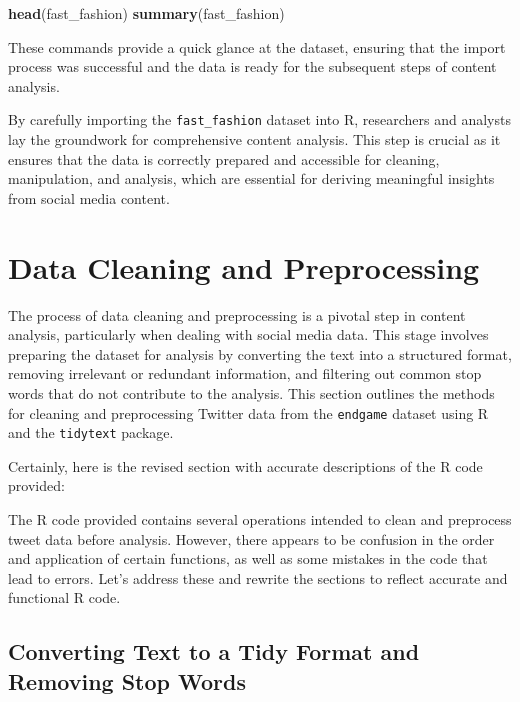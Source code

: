 \documentclass[
]{book}
\newenvironment{Shaded}{\begin{snugshade}}{\end{snugshade}}
\newcommand{\FunctionTok}[1]{\textcolor[rgb]{0.13,0.29,0.53}{\textbf{#1}}}
\newcommand{\NormalTok}[1]{#1}
\begin{document}
\begin{Shaded}
\begin{Highlighting}[]
\FunctionTok{head}\NormalTok{(fast\_fashion)}
\FunctionTok{summary}\NormalTok{(fast\_fashion)}
\end{Highlighting}
\end{Shaded}

These commands provide a quick glance at the dataset, ensuring that the import process was successful and the data is ready for the subsequent steps of content analysis.

By carefully importing the \texttt{fast\_fashion} dataset into R, researchers and analysts lay the groundwork for comprehensive content analysis. This step is crucial as it ensures that the data is correctly prepared and accessible for cleaning, manipulation, and analysis, which are essential for deriving meaningful insights from social media content.

\hypertarget{data-cleaning-and-preprocessing}{%
\section{Data Cleaning and Preprocessing}\label{data-cleaning-and-preprocessing}}

The process of data cleaning and preprocessing is a pivotal step in content analysis, particularly when dealing with social media data. This stage involves preparing the dataset for analysis by converting the text into a structured format, removing irrelevant or redundant information, and filtering out common stop words that do not contribute to the analysis. This section outlines the methods for cleaning and preprocessing Twitter data from the \texttt{endgame} dataset using R and the \texttt{tidytext} package.

Certainly, here is the revised section with accurate descriptions of the R code provided:

The R code provided contains several operations intended to clean and preprocess tweet data before analysis. However, there appears to be confusion in the order and application of certain functions, as well as some mistakes in the code that lead to errors. Let's address these and rewrite the sections to reflect accurate and functional R code.

\hypertarget{converting-text-to-a-tidy-format-and-removing-stop-words}{%
\subsection{Converting Text to a Tidy Format and Removing Stop Words}\label{converting-text-to-a-tidy-format-and-removing-stop-words}}
\end{document}
